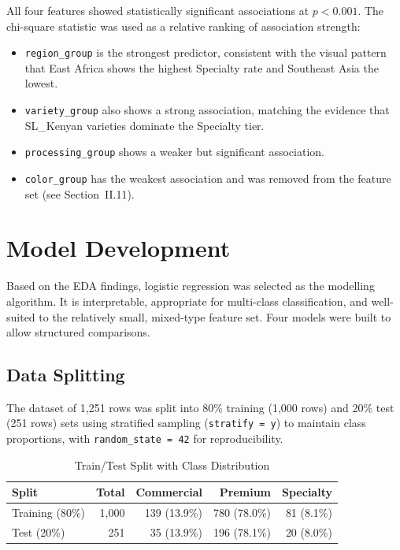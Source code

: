 \documentclass[12pt, a4paper]{article}
\begin{document}
All four features showed statistically significant associations at $p < 0.001$. The chi-square
statistic was used as a relative ranking of association strength:
\begin{itemize}
  \item \texttt{region\_group} is the strongest predictor, consistent with the visual pattern that
        East Africa shows the highest Specialty rate and Southeast Asia the lowest.
  \item \texttt{variety\_group} also shows a strong association, matching the evidence that
        SL\_Kenyan varieties dominate the Specialty tier.
  \item \texttt{processing\_group} shows a weaker but significant association.
  \item \texttt{color\_group} has the weakest association and was removed from the feature set
        (see Section~II.11).
\end{itemize}

\section{Model Development}

Based on the EDA findings, logistic regression was selected as the modelling algorithm. It is
interpretable, appropriate for multi-class classification, and well-suited to the relatively small,
mixed-type feature set. Four models were built to allow structured comparisons.

\subsection{Data Splitting}

The dataset of 1,251 rows was split into 80\% training (1,000 rows) and 20\% test (251 rows) sets
using stratified sampling (\texttt{stratify = y}) to maintain class proportions, with
\texttt{random\_state = 42} for reproducibility.

\begin{table}[H]
  \centering
  \caption{Train/Test Split with Class Distribution}
  \begin{tabular}{lrrrr}
    \toprule
    \textbf{Split} & \textbf{Total} & \textbf{Commercial} & \textbf{Premium} & \textbf{Specialty} \\
    \midrule
    Training (80\%) & 1,000 & 139 (13.9\%) & 780 (78.0\%) & 81 (8.1\%) \\
    Test (20\%)     &   251 &  35 (13.9\%) & 196 (78.1\%) & 20 (8.0\%) \\
    \bottomrule
  \end{tabular}
\end{table}
\end{document}
